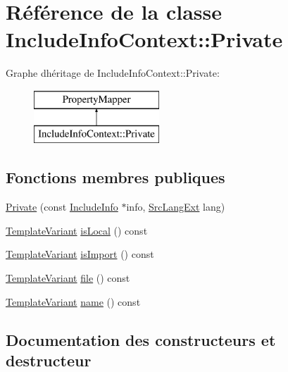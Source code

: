 \hypertarget{class_include_info_context_1_1_private}{}\section{Référence de la classe Include\+Info\+Context\+:\+:Private}
\label{class_include_info_context_1_1_private}
Graphe d\textquotesingle{}héritage de Include\+Info\+Context\+:\+:Private\+:\begin{figure}[H]
\begin{center}
\leavevmode
\includegraphics[height=2.000000cm]{class_include_info_context_1_1_private}
\end{center}
\end{figure}
\subsection*{Fonctions membres publiques}
\begin{DoxyCompactItemize}
\item 
\hyperlink{class_include_info_context_1_1_private_a3355e373355ffd73c8b598238b726e78}{Private} (const \hyperlink{struct_include_info}{Include\+Info} $\ast$info, \hyperlink{types_8h_a9974623ce72fc23df5d64426b9178bf2}{Src\+Lang\+Ext} lang)
\item 
\hyperlink{class_template_variant}{Template\+Variant} \hyperlink{class_include_info_context_1_1_private_ad0c6a7c76383104d00bc8358ece4e62c}{is\+Local} () const 
\item 
\hyperlink{class_template_variant}{Template\+Variant} \hyperlink{class_include_info_context_1_1_private_ac88310ca9f73483bd83fbdf37777812e}{is\+Import} () const 
\item 
\hyperlink{class_template_variant}{Template\+Variant} \hyperlink{class_include_info_context_1_1_private_ac7e7f3c152f3f18e10d47a102a7d17a5}{file} () const 
\item 
\hyperlink{class_template_variant}{Template\+Variant} \hyperlink{class_include_info_context_1_1_private_a16f70401ec55e1f199792f2a76709d5a}{name} () const 
\end{DoxyCompactItemize}


\subsection{Documentation des constructeurs et destructeur}
\hypertarget{class_include_info_context_1_1_private_a3355e373355ffd73c8b598238b726e78}{}
